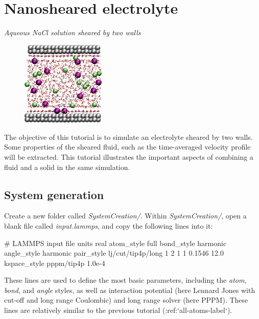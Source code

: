 \chapter{Nanosheared electrolyte}

\vspace{-1cm} \noindent \textcolor{graytitle}{\textit{{\Large Aqueous NaCl solution sheared by two walls}}\vspace{0.5cm} }

\noindent \hspace{-0.45cm}\begin{figure}
\includegraphics[width=4cm]{tutorials/level2/nanosheared-electrolyte/nanoconfined-electrolyte-light.png}
\end{figure}

\noindent The objective of this tutorial is to
simulate an electrolyte sheared by two walls. Some properties
of the sheared fluid, such as the time-averaged velocity profile
will be extracted. 
This tutorial illustrates the important aspects of
combining a fluid and a solid in the same simulation.

\section{System generation}

\noindent Create a new folder called \textit{SystemCreation/}. Within \textit{SystemCreation/},
open a blank file called \textit{input.lammps}, and copy 
the following lines into it:

\begin{lcverbatim}
# LAMMPS input file
units real
atom_style full
bond_style harmonic
angle_style harmonic
pair_style lj/cut/tip4p/long 1 2 1 1 0.1546 12.0
kspace_style pppm/tip4p 1.0e-4
\end{lcverbatim}

\noindent These lines are used to define the most basic parameters,
including the \textit{atom}, \textit{bond}, and \textit{angle} styles, as well as 
interaction potential (here Lennard Jones with cut-off and long 
range Coulombic) and long range solver (here PPPM). 
These lines are relatively similar to the 
previous tutorial (:ref:`all-atoms-label`).

